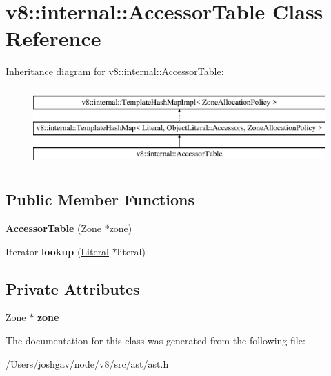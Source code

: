 \hypertarget{classv8_1_1internal_1_1_accessor_table}{}\section{v8\+:\+:internal\+:\+:Accessor\+Table Class Reference}
\label{classv8_1_1internal_1_1_accessor_table}
Inheritance diagram for v8\+:\+:internal\+:\+:Accessor\+Table\+:\begin{figure}[H]
\begin{center}
\leavevmode
\includegraphics[height=3.000000cm]{classv8_1_1internal_1_1_accessor_table}
\end{center}
\end{figure}
\subsection*{Public Member Functions}
\begin{DoxyCompactItemize}
\item 
{\bfseries Accessor\+Table} (\hyperlink{classv8_1_1internal_1_1_zone}{Zone} $\ast$zone)\hypertarget{classv8_1_1internal_1_1_accessor_table_adcee86ad1000d3d63e7360d0895fc2ae}{}\label{classv8_1_1internal_1_1_accessor_table_adcee86ad1000d3d63e7360d0895fc2ae}

\item 
Iterator {\bfseries lookup} (\hyperlink{classv8_1_1internal_1_1_literal}{Literal} $\ast$literal)\hypertarget{classv8_1_1internal_1_1_accessor_table_a064e2528f1da85829d8742c69adaba19}{}\label{classv8_1_1internal_1_1_accessor_table_a064e2528f1da85829d8742c69adaba19}

\end{DoxyCompactItemize}
\subsection*{Private Attributes}
\begin{DoxyCompactItemize}
\item 
\hyperlink{classv8_1_1internal_1_1_zone}{Zone} $\ast$ {\bfseries zone\+\_\+}\hypertarget{classv8_1_1internal_1_1_accessor_table_ae47d4062d555902a4f0bf13bfff5fba2}{}\label{classv8_1_1internal_1_1_accessor_table_ae47d4062d555902a4f0bf13bfff5fba2}

\end{DoxyCompactItemize}


The documentation for this class was generated from the following file\+:\begin{DoxyCompactItemize}
\item 
/\+Users/joshgav/node/v8/src/ast/ast.\+h\end{DoxyCompactItemize}

